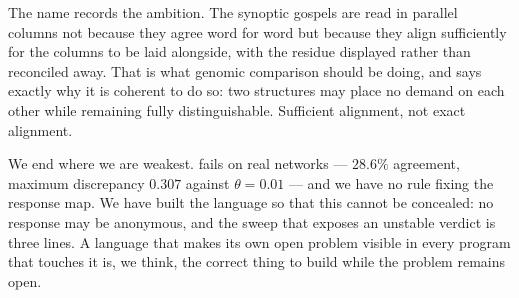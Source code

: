 \documentclass[11pt,twocolumn,a4paper]{article}
\theoremstyle{plain}
\theoremstyle{definition}
\theoremstyle{remark}
\begin{document}
The name records the ambition. The synoptic gospels are read in parallel
columns not because they agree word for word but because they align
sufficiently for the columns to be laid alongside, with the residue
displayed rather than reconciled away. That is what genomic comparison
should be doing, and  says exactly why it is coherent to
do so: two structures may place no demand on each other while remaining
fully distinguishable. Sufficient alignment, not exact alignment.

We end where we are weakest.  fails on real networks
--- $28.6\%$ agreement, maximum discrepancy $0.307$ against
$\theta=0.01$ --- and we have no rule fixing the response map. We have
built the language so that this cannot be concealed: no response may be
anonymous, and the sweep that exposes an unstable verdict is three
lines. A language that makes its own open problem visible in every
program that touches it is, we think, the correct thing to build while
the problem remains open.



\end{document}

